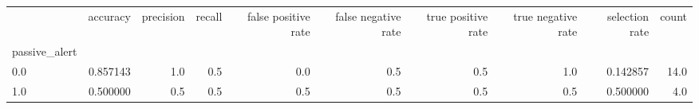 \begin{tabular}{lrrrrrrrrr}
\toprule
{} &  accuracy &  precision &  recall &  false positive rate &  false negative rate &  true positive rate &  true negative rate &  selection rate &  count \\
passive\_alert &           &            &         &                      &                      &                     &                     &                 &        \\
\midrule
0.0           &  0.857143 &        1.0 &     0.5 &                  0.0 &                  0.5 &                 0.5 &                 1.0 &        0.142857 &   14.0 \\
1.0           &  0.500000 &        0.5 &     0.5 &                  0.5 &                  0.5 &                 0.5 &                 0.5 &        0.500000 &    4.0 \\
\bottomrule
\end{tabular}
